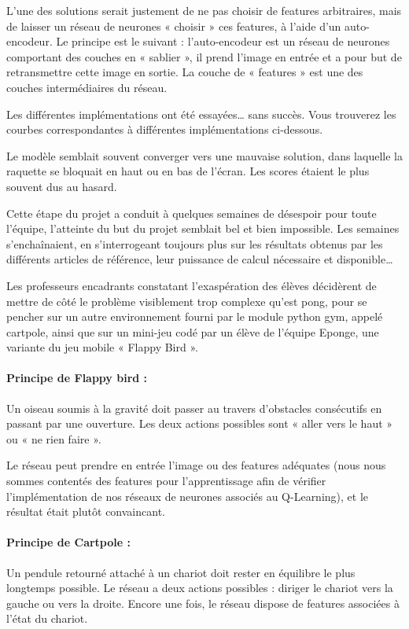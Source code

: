 \documentclass[
    10pt,
    a4paper,
    oneside,
    headinclude,footinclude,
    BCOR=5mm,
    captions=tableabove
]{scrartcl}
\begin{document}
L’une des solutions serait justement de ne pas choisir de features arbitraires, mais de laisser un réseau de neurones « choisir » ces features, à l’aide d’un auto-encodeur. Le principe est le suivant : l’auto-encodeur est un réseau de neurones comportant des couches en « sablier », il prend l’image en entrée et a pour but de retransmettre cette image en sortie. La couche de « features » est une des couches intermédiaires du réseau. %

Les différentes implémentations ont été essayées… sans succès. Vous trouverez les courbes correspondantes à différentes implémentations ci-dessous.

Le modèle semblait souvent converger vers une mauvaise solution, dans laquelle la raquette se bloquait en haut ou en bas de l'écran. Les scores étaient le plus souvent dus au hasard.


Cette étape du projet a conduit à quelques semaines de désespoir pour toute l’équipe, l’atteinte du but du projet semblait bel et bien impossible. Les semaines s’enchaînaient, en s’interrogeant toujours plus sur les résultats obtenus par les différents articles de référence, leur puissance de calcul nécessaire et disponible…

Les professeurs encadrants constatant l’exaspération des élèves décidèrent de mettre de côté le problème visiblement trop complexe qu’est pong, pour se pencher sur un autre environnement fourni par le module python gym, appelé cartpole, ainsi que sur un mini-jeu codé par un élève de l’équipe Eponge, une variante du jeu mobile « Flappy Bird ».

\paragraph{Principe de Flappy bird :}
Un oiseau soumis à la gravité doit passer au travers d’obstacles consécutifs en passant par une ouverture. Les deux actions possibles sont « aller vers le haut » ou « ne rien faire ».

Le réseau peut prendre en entrée l’image ou des features adéquates (nous nous sommes contentés des features pour l’apprentissage afin de vérifier l’implémentation de nos réseaux de neurones associés au Q-Learning), et le résultat était plutôt convaincant.

\paragraph{Principe de Cartpole :}
Un pendule retourné attaché à un chariot doit rester en équilibre le plus longtemps possible. Le réseau a deux actions possibles : diriger le chariot vers la gauche ou vers la droite. Encore une fois, le réseau dispose de features associées à l’état du chariot.
\end{document}
